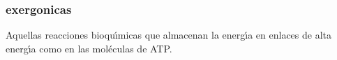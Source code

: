 \subsubsection{\gls{exergonicas}} Aquellas reacciones
bioqu\'{\i}micas que almacenan la energ\'{\i}a en enlaces de alta energ\'{\i}a como en las
mol\'eculas de ATP.








